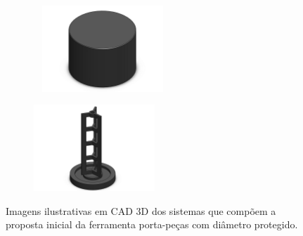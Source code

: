 \begin{figure}[htb]
    \centering
    \begin{subfigure}{.5\textwidth}\
        \centering
        \includegraphics[width = 0.5\textwidth]{Figures/Cap3/Tampa_P.png}
        \caption{}
        \label{fig:tampa_simples}
    \end{subfigure}%
    \begin{subfigure}{.5\textwidth}
        \centering
        \includegraphics[width = 0.5\textwidth]{Figures/Cap3/Falsa_coroa_modificada.png}
        \caption{}
        \label{fig:falsa_coroa_torre}
    \end{subfigure}
    \caption[Imagens ilustrativas dos componentes modificados da proposta inicial.]%
    {Imagens ilustrativas em CAD 3D dos sistemas que compõem a proposta inicial da ferramenta porta-peças com diâmetro protegido.}
\end{figure}
\newpage
